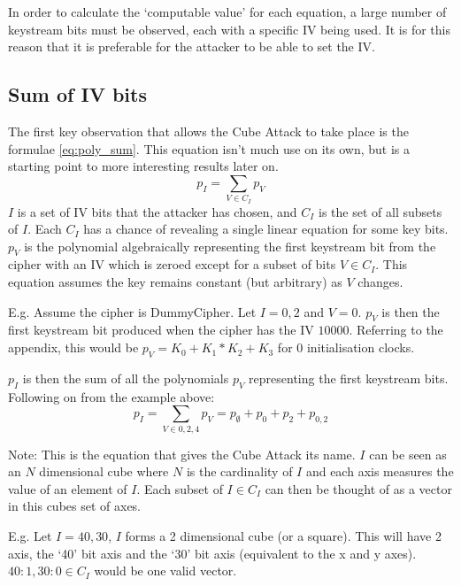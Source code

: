 \documentclass{report}
\let\Oldsubsection\subsection
\renewcommand{\subsection}{\FloatBarrier\Oldsubsection}
\begin{document}
In order to calculate the `computable value' for each equation, a large number of keystream bits must be observed, each with a specific IV being used. It is for this reason that it is preferable for the attacker to be able to set the IV.

\subsection{Sum of IV bits}
The first key observation that allows the Cube Attack to take place is the formulae \ref{eq:poly_sum}. This equation isn't much use on its own, but is a starting point to more interesting results later on.
\begin{equation} \label{eq:poly_sum}
p_I = \sum\limits_{V \in C_I} p_V
\end{equation}
$I$ is a set of IV bits that the attacker has chosen, and $C_I$ is the set of all subsets of $I$. Each $C_I$ has a chance of revealing a single linear equation for some key bits.
$p_V$ is the polynomial algebraically representing the first keystream bit from the cipher with an IV which is zeroed except for a subset of bits $V\in C_I$. This equation assumes the key remains constant (but arbitrary) as $V$ changes.

E.g. Assume the cipher is DummyCipher. Let $I = {0,2}$ and $V = {0}$. $p_V$ is then the first keystream bit produced when the cipher has the IV $10000$. Referring to the appendix, this would be $p_V = K_0+K_1*K_2+K_3$ for 0 initialisation clocks.

$p_I$ is then the sum of all the polynomials $p_V$ representing the first keystream bits. Following on from the example above:
\begin{equation}\label{eq:poly_sum_eg}
p_I = \sum\limits_{V \in {0,2,4}} p_V  = p_{\emptyset} + p_{0} + p_2 + p_{0,2}
\end{equation}

Note: This is the equation that gives the Cube Attack its name. $I$ can be seen as an $N$ dimensional cube where $N$ is the cardinality of $I$ and each axis measures the value of an element of $I$. Each subset of $I \in C_I$ can then be thought of as a vector in this cubes set of axes.

E.g. Let $I = {40, 30}$, $I$ forms a 2 dimensional cube (or a square). This will have 2 axis, the `40' bit axis and the `30' bit axis (equivalent to the x and y axes). ${40:1, 30:0} \in C_I$ would be one valid vector.

\begin{figure}[h]
\end{figure}
\end{document}
